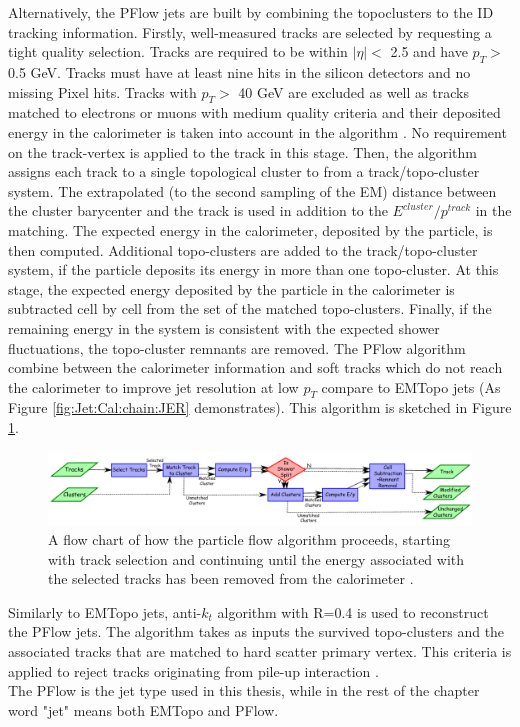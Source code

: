 Alternatively, the PFlow jets are built by combining the topoclusters to the ID tracking information. Firstly, well-measured tracks are selected by requesting a tight quality selection. Tracks are required to be within $|\eta|<$ 2.5 and have $p_T>$ 0.5 GeV. Tracks must have at least nine hits in the silicon detectors and no missing Pixel hits. Tracks with $p_T>$ 40 GeV are excluded as well as tracks matched to electrons or muons with medium quality criteria and their deposited energy in the calorimeter is taken into account in the algorithm \cite{PFlow_Reco}. No requirement on the track-vertex is applied to the track in this stage. Then, the algorithm assigns each track to a single topological cluster to from a track/topo-cluster system. The extrapolated (to the second sampling of the EM) distance between the cluster barycenter and the track is used in addition to the $E^{cluster}/p^{track}$ in the matching. The expected energy in the calorimeter, deposited by the particle, is then computed. Additional topo-clusters are added to the track/topo-cluster system, if the particle deposits its energy in more than one topo-cluster. At this stage, the expected energy deposited by the particle in the calorimeter is subtracted cell by cell from the set of the matched topo-clusters. Finally, if the remaining energy in the system is consistent with the expected shower fluctuations, the topo-cluster remnants are removed. The PFlow algorithm combine between the calorimeter information and soft tracks which do not reach the calorimeter to improve jet resolution at low $p_T$ compare to EMTopo jets (As Figure \ref{fig:Jet:Cal:chain:JER} demonstrates). This algorithm is sketched in Figure \ref{fig:Jet:JR:PFlowSketch}. 

\begin{figure}[htbp]
    \centering
    \includegraphics[width=1.\textwidth]{Ch4/Img/PFlow_Algo.png}
    \caption{A flow chart of how the particle flow algorithm proceeds, starting with track selection and continuing until the energy associated with the selected tracks has been removed from the calorimeter \cite{PFlow_Reco}.}
    \label{fig:Jet:JR:PFlowSketch}
\end{figure}
Similarly to EMTopo jets, anti-$k_t$ algorithm with R=0.4 is used to reconstruct the PFlow jets. The algorithm takes as inputs the survived topo-clusters and the associated tracks that are matched to hard scatter primary vertex. This criteria is applied to reject tracks originating from pile-up interaction \cite{Jet_pileUp}. \\
The PFlow is the jet type used in this thesis, while in the rest of the chapter word "jet" means both EMTopo and PFlow.

